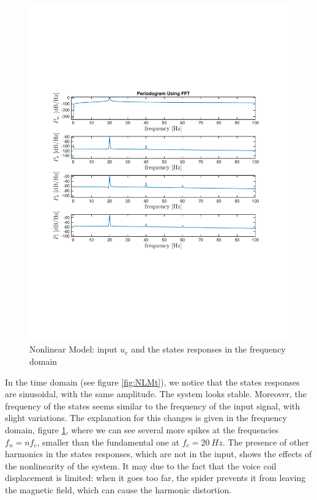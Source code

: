 \begin{figure}[H]
 \centering 
 \includegraphics[trim=2cm 7cm 2cm 7cm, clip=true, totalheight=0.35\textheight, angle=0]{figures/responseNLMf2.pdf}
 \caption{Nonlinear Model: input $u_e$ and the states responses in the frequency domain}
 \label{fig:NLMf}
\end{figure}

In the time domain (see figure \ref{fig:NLMt}), we notice that the states responses are sinusoidal, with the same amplitude. The system looks stable. Moreover, the frequency of the states seems similar to the frequency of the input signal, with slight variations. The explanation for this changes is given in the frequency domain, figure \ref{fig:NLMf}, where we can see several more spikes at the frequencies $f_n = nf_c$, smaller than the fundamental one at $f_c = 20 \ Hz$. The presence of other harmonics in the states responses, which are not in the input, shows the effects of the nonlinearity of the system. It may due to the fact that the voice coil displacement is limited: when it goes too far, the spider prevents it from leaving the magnetic field, which can cause the harmonic distortion. 